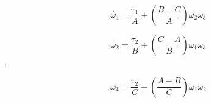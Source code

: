 \begin{equation}
  \dot{\omega_{1}}=\frac{\tau_{1}}{A}+\left(\frac{B-C}{A}\right)\omega_{2}\omega_{3}
\end{equation}

\begin{equation}
  \dot{\omega_{2}}=\frac{\tau_{2}}{B}+\left(\frac{C-A}{B}\right)\omega_{1}\omega_{3}
\end{equation},

\begin{equation}
  \dot{\omega_{3}}=\frac{\tau_{2}}{C}+\left(\frac{A-B}{C}\right)\omega_{1}\omega_{2}
\end{equation}










